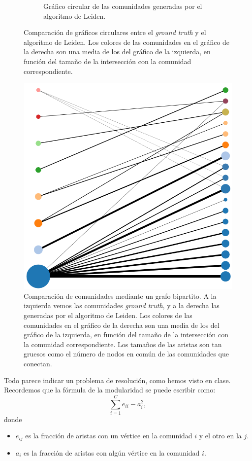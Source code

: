 \begin{figure}[!htb]
\begin{subfigure}{.4\textwidth}
    \caption{Gráfico circular de las comunidades generadas por el algoritmo de Leiden. }
    \label{fig:1-circular-comp-2}
  \end{subfigure}
  \caption{Comparación de gráficos circulares entre el \emph{ground truth} y el
    algoritmo de Leiden. Los colores de las comunidades en el gráfico de la
    derecha son una media de los del gráfico de la izquierda, en función del
    tamaño de la intersección con la comunidad correspondiente.}
  \label{fig:1-circular-comp}
\end{figure}

\begin{figure}[!htb]
  \centering
  \includegraphics[width=.7\linewidth]{img/1_bipartite_comp}
  \caption{Comparación de comunidades mediante un grafo bipartito. A la
    izquierda vemos las comunidades \emph{ground truth}, y a la derecha las
    generadas por el algoritmo de Leiden.  Los colores de las comunidades en el
    gráfico de la derecha son una media de los del gráfico de la izquierda, en
    función del tamaño de la intersección con la comunidad correspondiente. Los
    tamaños de las aristas son tan gruesos como el número de nodos en común de las
    comunidades que conectan.}
  \label{fig:1-bipartite}
\end{figure}



Todo parece indicar un problema de resolución, como hemos visto en clase.
Recordemos que la fórmula de la modularidad se puede escribir como:
$$
\sum_{i=1}^C e_{ii} - a_i^2,
$$
donde
\begin{itemize}
  \item $e_{ij}$ es la fracción de aristas con un vértice en la comunidad $i$ y
    el otro en la $j$.
  \item $a_i$ es la fracción de aristas con algún vértice en la comunidad $i$.
\end{itemize}

